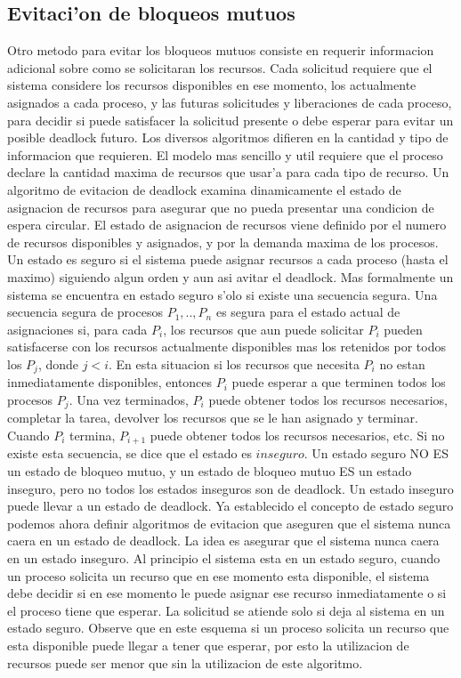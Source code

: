 \documentclass[a4paper,10pt]{article}
\begin{document}
\subsection{Evitaci'on de bloqueos mutuos}
Otro metodo para evitar los bloqueos mutuos consiste en requerir informacion adicional sobre como se solicitaran los recursos. Cada solicitud requiere que el sistema considere los recursos disponibles en ese momento, los actualmente asignados a cada proceso, y las futuras solicitudes y liberaciones de cada proceso, para decidir si puede satisfacer la solicitud presente o debe esperar para evitar un posible deadlock futuro.
Los diversos algoritmos difieren en la cantidad y tipo de informacion que requieren. El modelo mas sencillo y util requiere que el proceso declare la cantidad maxima de recursos que usar'a para cada tipo de recurso. Un algoritmo de evitacion de deadlock examina dinamicamente el estado de asignacion de recursos para asegurar que no pueda presentar una condicion de espera circular. El estado de asignacion de recursos viene definido por el numero de recursos disponibles y asignados, y por la demanda maxima de los procesos. Un estado es seguro si el sistema puede asignar recursos a cada proceso (hasta el maximo) siguiendo algun orden y aun asi avitar el deadlock. Mas formalmente un sistema se encuentra en estado seguro s'olo si existe una secuencia segura. Una secuencia segura de procesos $P_{1},..,P_{n}$ es segura para el estado actual de asignaciones si, para cada $P_{i}$, los recursos que aun puede solicitar $P_{i}$ pueden satisfacerse con los recursos actualmente disponibles mas los retenidos por todos los $P_{j}$, donde $j<i$. En esta situacion si los recursos que necesita $P_{i}$ no estan inmediatamente disponibles, entonces $P_{i}$ puede esperar a que terminen todos los procesos $P_{j}$. Una vez terminados, $P_{i}$ puede obtener todos los recursos necesarios, completar la tarea, devolver los recursos que se le han asignado y terminar. Cuando $P_{i}$ termina, $P_{i+1}$ puede obtener todos los recursos necesarios, etc. Si no existe esta secuencia, se dice que el estado es $inseguro$.
Un estado seguro NO ES un estado de bloqueo mutuo, y un estado de bloqueo mutuo ES un estado inseguro, pero no todos los estados inseguros son de deadlock. Un estado inseguro puede llevar a un estado de deadlock.
Ya establecido el concepto de estado seguro podemos ahora definir algoritmos de evitacion que aseguren que el sistema nunca caera en un estado de deadlock. La idea es asegurar que el sistema nunca caera en un estado inseguro. Al principio el sistema esta en un estado seguro, cuando un proceso solicita un recurso que en ese momento esta disponible, el sistema debe decidir si en ese momento le puede asignar ese recurso inmediatamente o si el proceso tiene que esperar. La solicitud se atiende solo si deja al sistema en un estado seguro.
Observe que en este esquema si un proceso solicita un recurso que esta disponible puede llegar a tener que esperar, por esto la utilizacion de recursos puede ser menor que sin la utilizacion de este algoritmo.
\end{document}
